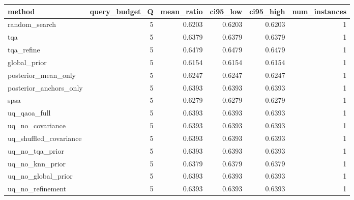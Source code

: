 \begin{tabular}{lrrrrr}
\toprule
method & query_budget_Q & mean_ratio & ci95_low & ci95_high & num_instances \\
\midrule
random_search & 5 & 0.6203 & 0.6203 & 0.6203 & 1 \\
tqa & 5 & 0.6379 & 0.6379 & 0.6379 & 1 \\
tqa_refine & 5 & 0.6479 & 0.6479 & 0.6479 & 1 \\
global_prior & 5 & 0.6154 & 0.6154 & 0.6154 & 1 \\
posterior_mean_only & 5 & 0.6247 & 0.6247 & 0.6247 & 1 \\
posterior_anchors_only & 5 & 0.6393 & 0.6393 & 0.6393 & 1 \\
spsa & 5 & 0.6279 & 0.6279 & 0.6279 & 1 \\
uq_qaoa_full & 5 & 0.6393 & 0.6393 & 0.6393 & 1 \\
uq_no_covariance & 5 & 0.6393 & 0.6393 & 0.6393 & 1 \\
uq_shuffled_covariance & 5 & 0.6393 & 0.6393 & 0.6393 & 1 \\
uq_no_tqa_prior & 5 & 0.6393 & 0.6393 & 0.6393 & 1 \\
uq_no_knn_prior & 5 & 0.6379 & 0.6379 & 0.6379 & 1 \\
uq_no_global_prior & 5 & 0.6393 & 0.6393 & 0.6393 & 1 \\
uq_no_refinement & 5 & 0.6393 & 0.6393 & 0.6393 & 1 \\
\bottomrule
\end{tabular}

